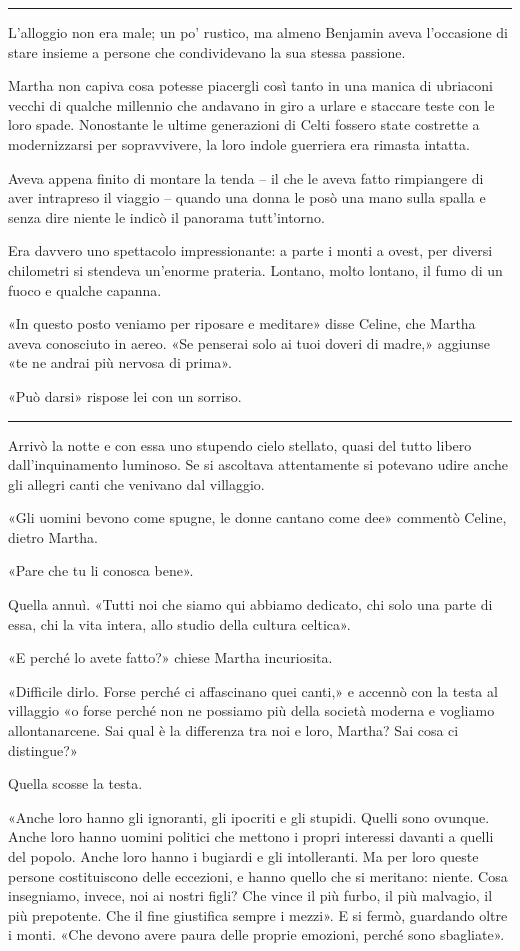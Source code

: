 \plainbreak{1}

L’alloggio non era male; un po' rustico, ma almeno Benjamin aveva l'occasione di stare insieme a
persone che condividevano la sua stessa passione.

Martha non capiva cosa potesse piacergli così tanto in una manica di ubriaconi vecchi di qualche
millennio che andavano in giro a urlare e staccare teste con le loro spade. Nonostante le ultime
generazioni di Celti fossero state costrette a modernizzarsi per sopravvivere, la loro indole
guerriera era rimasta intatta.

Aveva appena finito di montare la tenda -- il che le aveva fatto rimpiangere di aver intrapreso il
viaggio -- quando una donna le posò una mano sulla spalla e senza dire niente le indicò il panorama
tutt'intorno.

Era davvero uno spettacolo impressionante: a parte i monti a ovest, per diversi chilometri si
stendeva un'enorme prateria. Lontano, molto lontano, il fumo di un fuoco e qualche capanna.

«In questo posto veniamo per riposare e meditare» disse Celine, che Martha aveva conosciuto in
aereo. «Se penserai solo ai tuoi doveri di madre,» aggiunse «te ne andrai più nervosa di prima».

«Può darsi» rispose lei con un sorriso.

\plainbreak{1}

Arrivò la notte e con essa uno stupendo cielo stellato, quasi del tutto libero dall'inquinamento
luminoso. Se si ascoltava attentamente si potevano udire anche gli allegri canti che venivano dal
villaggio.

«Gli uomini bevono come spugne, le donne cantano come dee» commentò Celine, dietro Martha.

«Pare che tu li conosca bene».

Quella annuì. «Tutti noi che siamo qui abbiamo dedicato, chi solo una parte di essa, chi la vita
intera, allo studio della cultura celtica».

«E perché lo avete fatto?» chiese Martha incuriosita.

«Difficile dirlo. Forse perché ci affascinano quei canti,» e accennò con la testa al villaggio «o
forse perché non ne possiamo più della società moderna e vogliamo allontanarcene. Sai qual è la
differenza tra noi e loro, Martha? Sai cosa ci distingue?»

Quella scosse la testa.

«Anche loro hanno gli ignoranti, gli ipocriti e gli stupidi. Quelli sono ovunque. Anche loro hanno
uomini politici che mettono i propri interessi davanti a quelli del popolo. Anche loro hanno i
bugiardi e gli intolleranti. Ma per loro queste persone costituiscono delle eccezioni, e hanno
quello che si meritano: niente. Cosa insegniamo, invece, noi ai nostri figli? Che vince il più
furbo, il più malvagio, il più prepotente. Che il fine giustifica sempre i mezzi». E si fermò,
guardando oltre i monti. «Che devono avere paura delle proprie emozioni, perché sono sbagliate».

